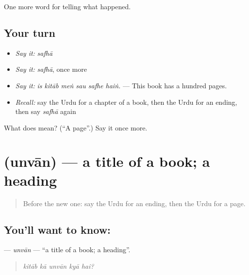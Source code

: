 \begin{grammarlens}[title={What you've built}]
One more word for telling what happened.
\end{grammarlens}

\subsection*{Your turn}
\begin{itemize}
\raggedright
  \item \emph{Say it:} \emph{safhā}
  \item \emph{Say it:} \emph{safhā}, once more
  \item \emph{Say it:} \emph{is kitāb meṅ sau safhe haiṅ.} — This book has a hundred pages.
  \item \emph{Recall:} say the Urdu for a chapter of a book, then the Urdu for an ending, then say \emph{safhā} again
\end{itemize}

\begin{tcolorbox}[breakable,colback=teal!4,colframe=teal!35!black,title={Before you move on}]
What does  mean? (\textquotedblleft{}A page\textquotedblright{}.) Say it once more.
\end{tcolorbox}
\section[\texorpdfstring{\ur{عنوان} (unvān)}{عنوان (unvān)}]{ (unvān) — a title of a book; a heading}

\label{lesson:UR-C330-unvan}



\begin{quote}
Before the new one: say the Urdu for an ending, then the Urdu for a page.
\end{quote}

\subsection*{You'll want to know: }
\textbf{} — \emph{unvān} — \textquotedblleft{}a title of a book; a heading\textquotedblright{}.

\begin{quote}
    
\end{quote}

\begin{quote}
\emph{kitāb kā unvān kyā hai?}
\end{quote}

